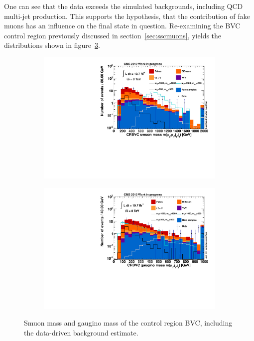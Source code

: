 One can see that the data exceeds the simulated backgrounds, including QCD multi-jet production. This supports the hypothesis, that the contribution of fake muons has an influence on the final state in question. Re-examining the BVC control region previously discussed in section~\ref{sec:sscmuons}, yields the distributions shown in figure~\ref{fig:CRBVC}.

\begin{figure}[hb!]
  \centering
  \begin{subfigure}[b]{0.495\textwidth}
    \centering
    \includegraphics[width=\textwidth]{plots/CR6_m_smuon.pdf}
    \caption{\label{fig:CRBVC_m_smuon}}
  \end{subfigure}
  \begin{subfigure}[b]{0.495\textwidth}
    \centering
    \includegraphics[width=\textwidth]{plots/CR6_m_gaugino.pdf}
    \caption{\label{fig:CRBVC_m_gaugino}}
  \end{subfigure}

  \caption{Smuon mass and gaugino mass of the control region BVC, including the data-driven background estimate.}
  \label{fig:CRBVC}
\end{figure}

